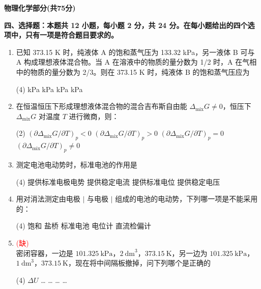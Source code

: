 \vspace{1cm}
\begin{center}
    {\Large \textbf{物理化学部分(共75分)}}
\end{center}

\vspace{0.5cm}
\noindent\textbf{四、选择题：本题共 12 小题，每小题 2 分，共 24 分。在每小题给出的四个选项中，只有一项是符合题目要求的。}

\begin{enumerate}[label=\arabic*., itemsep=1.5ex]
    \item 已知 373.15 K 时，纯液体 A 的饱和蒸气压为 133.32 kPa，另一液体 B 可与 A 构成理想液体混合物。当 A 在溶液中的物质的量分数为 1/2 时，A 在气相中的物质的量分数为 2/3。则在 373.15 K 时，纯液体 B 的饱和蒸气压应为
    \begin{tasks}(4)
         kPa
         kPa
         kPa
         kPa
    \end{tasks}

    \item 在恒温恒压下形成理想液体混合物的混合吉布斯自由能 $\Delta_{\text{mix}}G \neq 0$，恒压下 $\Delta_{\text{mix}}G$ 对温度 $T$ 进行微商，则：
    \begin{tasks}(2)
        \task $(\partial \Delta_{\text{mix}}G / \partial T)_p < 0$
        \task $(\partial \Delta_{\text{mix}}G / \partial T)_p > 0$
        \task $(\partial \Delta_{\text{mix}}G / \partial T)_p = 0$
        \task $(\partial \Delta_{\text{mix}}G / \partial T)_p \neq 0$
    \end{tasks}

    \item 测定电池电动势时，标准电池的作用是
    \begin{tasks}(4)
        \task 提供标准电极电势
        \task 提供稳定电流
        \task 提供标准电位
        \task 提供稳定电压
    \end{tasks}

    \item 用对消法测定由电极  $\mid$  与电极  $\mid$  组成的电池的电动势，下列哪一项是不能采用的：
    \begin{tasks}(4)
        \task 饱和  盐桥
        \task 标准电池
        \task 电位计
        \task 直流检偏计
    \end{tasks}

    \item \textcolor{red}{(缺)}\\
    密闭容器，一边是 $101.325\ \text{kPa}$，$2\ \text{dm}^3$，$373.15\ \text{K}$，另一边为 $101.325\ \text{kPa}$，$1\ \text{dm}^3$，$373.15\ \text{K}$，现在将中间隔板撤掉，问下列哪个是正确的
    \begin{tasks}(4)
        \task $\Delta U$ \dots
        \task \dots
        \task \dots
        \task \dots
    \end{tasks}


\end{enumerate}
